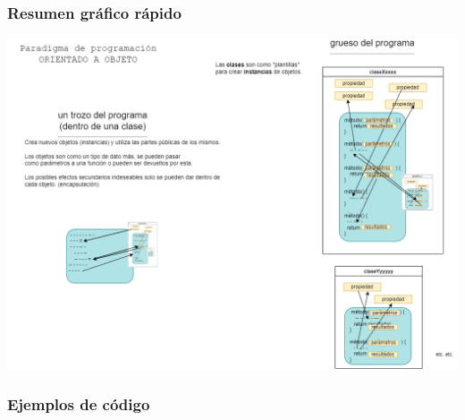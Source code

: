 \documentclass[spanish,12pt,a4paper,final,oneside]{book}
\begin{document}
\subsubsection*{Resumen gráfico rápido}
\includegraphics[width=\textwidth]{Paradigma de programacion - ORIENTADO A OBJETO}



\subsubsection*{Ejemplos de código}
\end{document}
